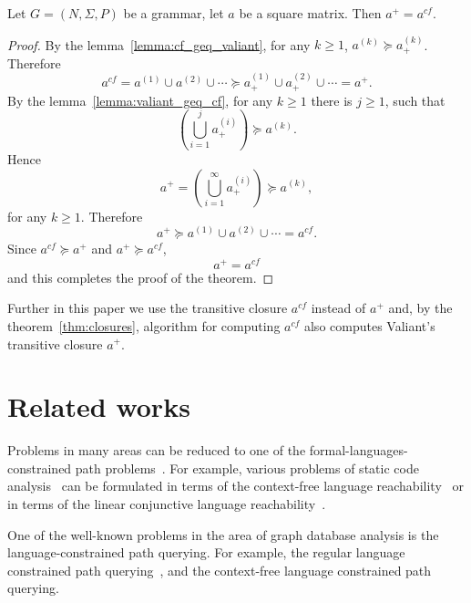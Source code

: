 \documentclass[runningheads,a4paper]{llncs}
\begin{document}
\begin{mytheorem}\label{thm:closures}
	Let $G =(N,\Sigma,P)$ be a grammar, let $a$ be a square matrix. Then $a^+ = a^{cf}$.
\end{mytheorem}
\begin{proof}
	
	By the lemma~\ref{lemma:cf_geq_valiant}, for any $k \geq 1$, $a^{(k)} \succeq a^{(k)}_+$. Therefore $$a^{cf} = a^{(1)} \cup a^{(2)} \cup \cdots \succeq a^{(1)}_+ \cup a^{(2)}_+ \cup \cdots = a^+.$$ By the lemma~\ref{lemma:valiant_geq_cf}, for any $k \geq 1$ there is $j \geq 1$, such that $$(\bigcup^{j}_{i=1}{a^{(i)}_+}) \succeq a^{(k)}.$$ Hence $$a^+ = (\bigcup^{\infty}_{i=1}{a^{(i)}_+}) \succeq a^{(k)},$$ for any $k \geq 1$. Therefore $$a^+ \succeq a^{(1)} \cup a^{(2)} \cup \cdots = a^{cf}.$$ Since $a^{cf} \succeq a^+$ and $a^+ \succeq a^{cf}$, $$a^+ = a^{cf}$$ and this completes the proof of the theorem.
\end{proof}

Further in this paper we use the transitive closure $a^{cf}$ instead of $a^+$ and, by the theorem~\ref{thm:closures}, algorithm for computing $a^{cf}$ also computes Valiant's transitive closure $a^+$.

\section{Related works} \label{section_related}%
Problems in many areas can be reduced to one of the formal-languages-constrained path problems~\cite{barrett2000formal}. For example, various problems of static code analysis~\cite{bastani2015specification,xu2009scaling} can be formulated in terms of the context-free language reachability~\cite{reps1998program} or in terms of the linear conjunctive language reachability~\cite{zhang2017context}. 

One of the well-known problems in the area of graph database analysis is the language-constrained path querying. For example, the regular language constrained path querying~\cite{reutter2017regular,fan2011adding,abiteboul1997regular,nole2016regular}, and the context-free language constrained path querying.
\end{document}
